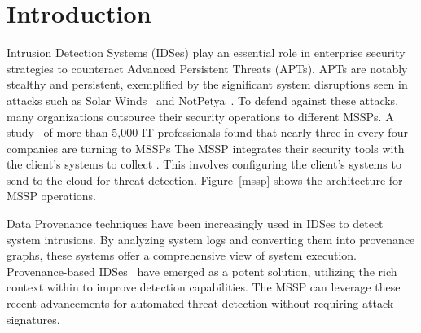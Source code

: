 \section{Introduction}
\label{s:intro}




Intrusion Detection Systems (IDSes) play an essential role in enterprise security strategies to counteract Advanced Persistent Threats (APTs). APTs are notably stealthy and persistent, exemplified by the significant system disruptions seen in attacks such as Solar Winds~\cite{solarwinds} and NotPetya~\cite{notpetya}. To defend against these attacks, many organizations outsource their security operations to different MSSPs. A study~\cite{msspsurvey}  of more than 5,000 IT professionals found that nearly three in every four companies are turning to MSSPs The MSSP integrates their security tools with the client's systems to collect \logs. This involves configuring the client’s systems to send \logs to the cloud for threat detection. Figure~\ref{mssp} shows the architecture for MSSP operations.

Data Provenance techniques have been increasingly used in IDSes to detect system intrusions. By analyzing system logs and converting them into provenance graphs, these systems offer a comprehensive view of system execution. Provenance-based IDSes~\cite{streamspot,provdetector2020,wang2022threatrace,shadewatcher,yangprographer,han2020unicorn} have emerged as a potent solution, utilizing the rich context within \logs to improve detection capabilities. The MSSP can leverage these recent advancements for automated threat detection without requiring attack signatures.


